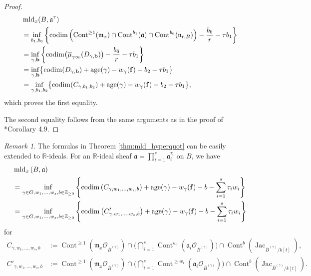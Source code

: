 \documentclass[a4paper,11pt]{amsart}
\theoremstyle{definition}
\theoremstyle{remark}
\newtheorem{rmk}[thm]{Remark}
\begin{document}
\begin{proof}
\begin{align*}
&\operatorname{mld}_x(B,\mathfrak{a}^{\tau})\\
&=
\inf _{b_1, b_6} \left\{ 
\operatorname{codim}\left( \operatorname{Cont}^{\ge 1}(\mathfrak m_x)
\cap \operatorname{Cont}^{b_1} (\mathfrak a) 
\cap \operatorname{Cont}^{b_6}(\mathfrak n_{r,B})  \right)
-\frac{b_6}{r}- \tau b_1
 \right\} \\
&= \inf _{\gamma, {\bf b}}
\left\{ 
\operatorname{codim}\bigl( \overline{\mu}_{\gamma \infty} (D_{\gamma, {\bf b}}) \bigr) 
-\frac{b_6}{r}- \tau b_1
 \right\} \\
&= \inf _{\gamma, {\bf b}}
\bigl \{ 
\operatorname{codim}( D_{\gamma, {\bf b}} ) 
+ \operatorname{age}(\gamma) - w_\gamma({\bf f})  - b_2 - \tau b_1
 \bigr \} \\ 
&=\inf _{\gamma, b_1, b_2}
\bigl \{
\operatorname{codim} (C_{\gamma, b_1, b_2}) + \operatorname{age}(\gamma) - w_\gamma({\bf f})  - b_2 - \tau b_1
\bigr \}, 
\end{align*}
which proves the first equality.

The second equality follows from the same arguments as in the proof of \cite{NS22}*{Corollary 4.9}. 
\end{proof}

\begin{rmk}\label{rmk:multi_index}
The formulas in Theorem \ref{thm:mld_hyperquot} can be easily extended to $\mathbb{R}$-ideals.
For an $\mathbb{R}$-ideal sheaf $\mathfrak{a} = \prod _{i=1} ^s \mathfrak{a}_i ^{\tau _i}$ on $B$, 
we have 
\begin{align*}
&\operatorname{mld}_x \left( B, \mathfrak{a} \right) \\
&= 
\inf _{\gamma \in G, w_1, \ldots, w_s, b \in \mathbb{Z}_{\ge 0}}
\left \{ 
\operatorname{codim} \left( C_{\gamma, w_1, \ldots , w_s, b} \right) + \operatorname{age}(\gamma) - w_\gamma({\bf f}) - b - \sum _{i=1} ^s \tau _i w_i
\right \} \\
&=
\inf _{\gamma \in G, w_1, \ldots, w_s, b \in \mathbb{Z}_{\ge 0}}
\left \{ 
\operatorname{codim} \left( C'_{\gamma, w_1, \ldots , w_s, b} \right) + \operatorname{age}(\gamma) - w_\gamma({\bf f}) - b - \sum _{i=1} ^s \tau _i w_i
\right \}
\end{align*}
for 
\begin{align*}
C_{\gamma, w_1, \ldots , w_s, b} & := 
\operatorname{Cont}^{\ge 1} \left( \mathfrak{m}_x \mathcal{O}_{\overline{B}^{(\gamma)}} \right) \cap
\biggl( \bigcap _{i=1} ^{s} \operatorname{Cont}^{w_i} \left(\mathfrak{a}_i \mathcal{O}_{\overline{B}^{(\gamma)}}\right) \biggr) 
 \cap \operatorname{Cont}^{b} \left( \operatorname{Jac}_{\overline{B}^{(\gamma)}/k[t]} \right), \\
C' _{\gamma, w_1, \ldots , w_s, b} & := 
\operatorname{Cont}^{\ge 1} \left( \mathfrak{m}_x \mathcal{O}_{\overline{B}^{(\gamma)}} \right) \cap
\biggl( \bigcap _{i=1} ^{s} \operatorname{Cont}^{\ge w_i}  \left( \mathfrak{a}_i \mathcal{O}_{\overline{B}^{(\gamma)}} \right) \biggr) 
 \cap \operatorname{Cont}^{b} \left( \operatorname{Jac}_{\overline{B}^{(\gamma)}/k[t]} \right). 
\end{align*}
\end{rmk}
\end{document}
